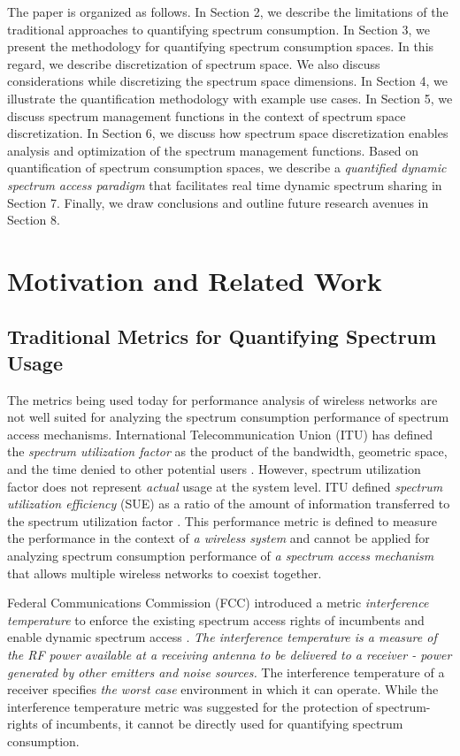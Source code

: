 \documentclass[journal,12pt,draftclsnofoot,onecolumn]{IEEEtran}
\begin{document}
The paper is organized as follows. In Section 2, we describe the limitations of the traditional approaches to quantifying spectrum consumption. In Section 3, we present the methodology for quantifying spectrum consumption spaces. In this regard, we describe discretization of spectrum space. We also discuss considerations while discretizing the spectrum space dimensions. In Section 4, we illustrate the quantification methodology with example use cases. In Section 5, we discuss spectrum management functions in the context of spectrum space discretization. In Section 6, we discuss how spectrum space discretization enables analysis and optimization of the spectrum management functions. Based on quantification of spectrum consumption spaces, we describe a \textit{quantified dynamic spectrum access paradigm} that facilitates real time dynamic spectrum sharing in Section 7. Finally, we draw conclusions and outline future research avenues in Section 8. 

\section{Motivation and Related Work}

\subsection{Traditional Metrics for Quantifying Spectrum Usage}
The metrics being used today for performance analysis of wireless networks are not well suited for analyzing the spectrum consumption performance of spectrum access mechanisms. International Telecommunication Union (ITU) has defined the \textit{spectrum utilization factor} as the product of the bandwidth, geometric space, and the time denied to other potential users \cite{itumetrics}. However, spectrum utilization factor does not represent \textit{actual} usage at the system level. 
ITU defined \textit{spectrum utilization efficiency} (SUE) as a ratio of the amount of information transferred to the spectrum utilization factor \cite{itumetrics}. This performance metric is defined to measure the performance in the context of \textit{a wireless system} and cannot be applied for analyzing spectrum consumption performance of \textit{a spectrum access mechanism} that allows multiple wireless networks to coexist together. 

Federal Communications Commission (FCC) introduced a metric \textit{interference temperature} to enforce the existing spectrum access rights of incumbents and enable dynamic spectrum access \cite{fccmetrics}. \textit{The interference temperature is a measure of the RF power available at a receiving antenna to be delivered to a receiver - power generated by other emitters and noise sources.} The interference temperature of a receiver specifies \textit{the worst case} environment in which it can operate. While the interference temperature metric was suggested for the protection of spectrum-rights of incumbents, it cannot be directly used for quantifying spectrum consumption.
\end{document}
